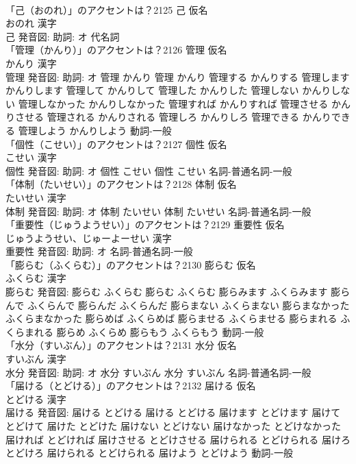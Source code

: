 \documentclass[8pt]{extreport}
\begin{document}
\begin{CJK}{UTF8}{min}
\\	「己（おのれ）」のアクセントは？2125	己 仮名　
\\	おのれ 漢字　
\\	己 発音図: 助詞: オ							代名詞 
\\	「管理（かんり）」のアクセントは？2126	管理 仮名　
\\	かんり 漢字　
\\	管理 発音図: 助詞: オ	管理 かんり		管理 かんり 管理する かんりする 管理します かんりします 管理して かんりして 管理した かんりした 管理しない かんりしない 管理しなかった かんりしなかった 管理すれば かんりすれば 管理させる かんりさせる 管理される かんりされる 管理しろ かんりしろ 管理できる かんりできる 管理しよう かんりしよう				動詞-一般 
\\	「個性（こせい）」のアクセントは？2127	個性 仮名　
\\	こせい 漢字　
\\	個性 発音図: 助詞: オ	個性 こせい		個性 こせい				名詞-普通名詞-一般 
\\	「体制（たいせい）」のアクセントは？2128	体制 仮名　
\\	たいせい 漢字　
\\	体制 発音図: 助詞: オ	体制 たいせい		体制 たいせい				名詞-普通名詞-一般 
\\	「重要性（じゅうようせい）」のアクセントは？2129	重要性 仮名　
\\	じゅうようせい、じゅーよーせい 漢字　
\\	重要性 発音図: 助詞: オ							名詞-普通名詞-一般 
\\	「膨らむ（ふくらむ）」のアクセントは？2130	膨らむ 仮名　
\\	ふくらむ 漢字　
\\	膨らむ 発音図:	膨らむ ふくらむ		膨らむ ふくらむ 膨らみます ふくらみます 膨らんで ふくらんで 膨らんだ ふくらんだ 膨らまない ふくらまない 膨らまなかった ふくらまなかった 膨らめば ふくらめば 膨らませる ふくらませる 膨らまれる ふくらまれる 膨らめ ふくらめ 膨らもう ふくらもう				動詞-一般 
\\	「水分（すいぶん）」のアクセントは？2131	水分 仮名　
\\	すいぶん 漢字　
\\	水分 発音図: 助詞: オ	水分 すいぶん		水分 すいぶん				名詞-普通名詞-一般 
\\	「届ける（とどける）」のアクセントは？2132	届ける 仮名　
\\	とどける 漢字　
\\	届ける 発音図:	届ける とどける		届ける とどける 届けます とどけます 届けて とどけて 届けた とどけた 届けない とどけない 届けなかった とどけなかった 届ければ とどければ 届けさせる とどけさせる 届けられる とどけられる 届けろ とどけろ 届けられる とどけられる 届けよう とどけよう				動詞-一般 

\end{CJK}
\end{document}
